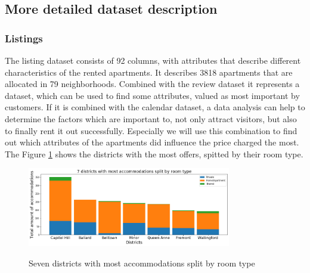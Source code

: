 \documentclass[journal]{IEEEtran}
\begin{document}
\subsection {More detailed dataset description}
\noindent \subsubsection{Listings}  The listing dataset consists of 92 columns, with attributes that describe different characteristics of the rented apartments. It describes 3818 apartments that are allocated in 79 neighborhoods. Combined with the review dataset it represents a dataset, which can be used to find some attributes, valued as most important by customers. If it is combined with the calendar dataset, a data analysis can help to determine the factors which are important to, not only attract visitors, but also to finally rent it out successfully. Especially we will use this combination to find out which attributes of the apartments did influence the price charged the most. The Figure \ref{districts_room_types} shows the districts with the most offers, spitted by their room type.
%
\begin{figure}
  \begin{center}
  \includegraphics[width=3.5in]{photo/4_most_acc_split_by_roomtype.png}\\
  \caption{Seven districts with most accommodations split by room type}\label{districts_room_types}
  \end{center}
\end{figure}
\end{document}

